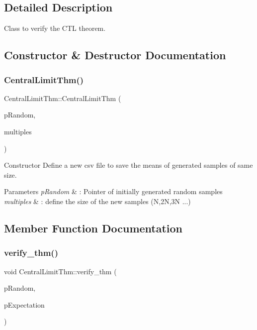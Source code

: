 \subsection{Detailed Description}
Class to verify the C\+TL theorem. 

\subsection{Constructor \& Destructor Documentation}
\mbox{\label{classCentralLimitThm_a41cc29d0165ac8738d926593a43fd586}} 
\subsubsection{\texorpdfstring{Central\+Limit\+Thm()}{CentralLimitThm()}}
{\footnotesize\ttfamily Central\+Limit\+Thm\+::\+Central\+Limit\+Thm (\begin{DoxyParamCaption}\item[{\hyperlink{classAbstractVariable}{Abstract\+Variable} $\ast$}]{p\+Random,  }\item[{int}]{multiples }\end{DoxyParamCaption})}



Constructor Define a new csv file to save the means of generated samples of same size. 


\begin{DoxyParams}{Parameters}
{\em p\+Random} & \+: Pointer of initially generated random samples \\
\hline
{\em multiples} & \+: define the size of the new samples (N,2N,3N ...) \\
\hline
\end{DoxyParams}


\subsection{Member Function Documentation}
\mbox{\label{classCentralLimitThm_a3898fbea7b16e86a2632914abbe67704}} 
\subsubsection{\texorpdfstring{verify\+\_\+thm()}{verify\_thm()}}
{\footnotesize\ttfamily void Central\+Limit\+Thm\+::verify\+\_\+thm (\begin{DoxyParamCaption}\item[{\hyperlink{classAbstractVariable}{Abstract\+Variable} $\ast$}]{p\+Random,  }\item[{\hyperlink{classAbstractExpectation}{Abstract\+Expectation} $\ast$}]{p\+Expectation }\end{DoxyParamCaption})}




